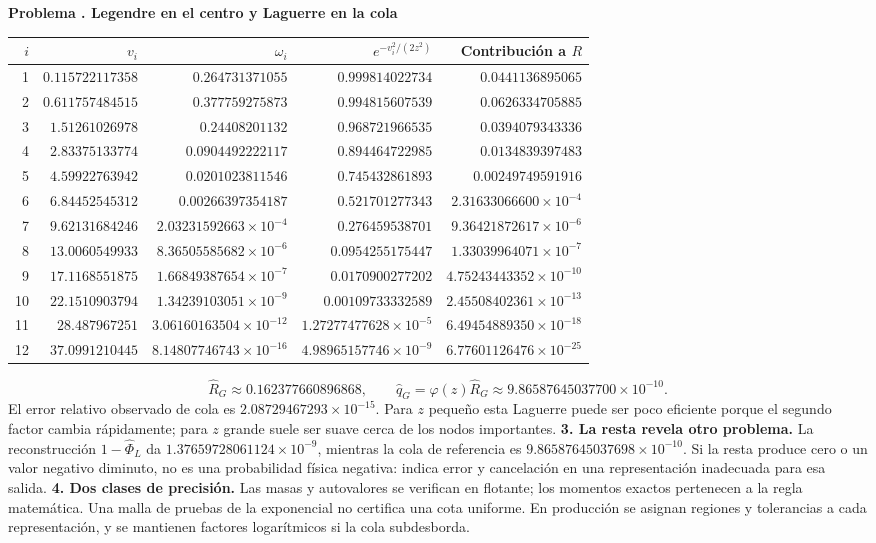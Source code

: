 \documentclass[11pt,a4paper]{article}
\theoremstyle{definition}
\newcounter{problema}
\newenvironment{resuelto}[1]{\refstepcounter{problema}\par\medskip\Needspace{6\baselineskip}\textbf{Problema \theproblema. #1}\par}{\par\medskip}
\begin{document}
\begin{resuelto}{Legendre en el centro y Laguerre en la cola}
\begin{center}\small\begin{tabular}{rrrrr}
\toprule
$i$&$v_i$&$\omega_i$&$e^{-v_i^2/(2z^2)}$&Contribución a $R$\\
\midrule
1&$0.115722117358$&$0.264731371055$&$0.999814022734$&$0.0441136895065$\\
2&$0.611757484515$&$0.377759275873$&$0.994815607539$&$0.0626334705885$\\
3&$1.51261026978$&$0.24408201132$&$0.968721966535$&$0.0394079343336$\\
4&$2.83375133774$&$0.0904492222117$&$0.894464722985$&$0.0134839397483$\\
5&$4.59922763942$&$0.0201023811546$&$0.745432861893$&$0.00249749591916$\\
6&$6.84452545312$&$0.00266397354187$&$0.521701277343$&$2.31633066600\times10^{-4}$\\
7&$9.62131684246$&$2.03231592663\times10^{-4}$&$0.276459538701$&$9.36421872617\times10^{-6}$\\
8&$13.0060549933$&$8.36505585682\times10^{-6}$&$0.0954255175447$&$1.33039964071\times10^{-7}$\\
9&$17.1168551875$&$1.66849387654\times10^{-7}$&$0.0170900277202$&$4.75243443352\times10^{-10}$\\
10&$22.1510903794$&$1.34239103051\times10^{-9}$&$0.00109733332589$&$2.45508402361\times10^{-13}$\\
11&$28.487967251$&$3.06160163504\times10^{-12}$&$1.27277477628\times10^{-5}$&$6.49454889350\times10^{-18}$\\
12&$37.0991210445$&$8.14807746743\times10^{-16}$&$4.98965157746\times10^{-9}$&$6.77601126476\times10^{-25}$\\
\bottomrule\end{tabular}\end{center}
\[
\widehat R_G\approx0.162377660896868,\qquad
\widehat q_G=\varphi(z)\widehat R_G\approx9.86587645037700\times10^{-10}.
\]
El error relativo observado de cola es $2.08729467293\times10^{-15}$. Para $z$ pequeño esta Laguerre puede ser poco eficiente porque el segundo factor cambia rápidamente; para $z$ grande suele ser suave cerca de los nodos importantes.
\textbf{3. La resta revela otro problema.} La reconstrucción $1-\widehat\Phi_L$ da $1.37659728061124\times10^{-9}$, mientras la cola de referencia es $9.86587645037698\times10^{-10}$. Si la resta produce cero o un valor negativo diminuto, no es una probabilidad física negativa: indica error y cancelación en una representación inadecuada para esa salida.
\textbf{4. Dos clases de precisión.} Las masas y autovalores se verifican en flotante; los momentos exactos pertenecen a la regla matemática. Una malla de pruebas de la exponencial no certifica una cota uniforme. En producción se asignan regiones y tolerancias a cada representación, y se mantienen factores logarítmicos si la cola subdesborda.
\end{resuelto}
\end{document}
